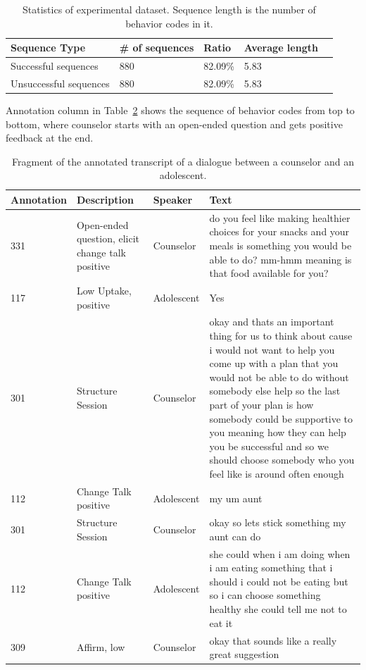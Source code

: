 \documentclass{amia_summit_2018}
\begin{document}
\begin{table}[h]
\centering
\caption{Statistics of experimental dataset. Sequence length is the number of behavior codes in it.}
\label{tab:data_dist}
  \begin{tabular}{|l|l|l|l|l|}
  \hline
   \textbf{Sequence Type} & \textbf{\# of sequences}  & \textbf{Ratio} & \textbf{Average length} \\ \hline      
Successful sequences & 880 & 82.09\% & 5.83 \\\hline
Unsuccessful sequences & 880 & 82.09\% & 5.83 \\\hline
  \end{tabular}
\end{table} 

Annotation column in Table~\ref{tab:anno_examp} shows the sequence of behavior codes from top to bottom, where counselor starts with an open-ended question and gets positive feedback at the end. \\

\begin{table}[h]
\caption{Fragment of the annotated transcript of a dialogue between a counselor and an adolescent.}    
\label{tab:anno_examp}
\centering
\begin{tabular}{|l|p{3.6cm}|l|p{8cm}|}
\hline
Annotation  & Description & Speaker & Text \\\hline
331 &	Open-ended question, elicit change talk positive &	Counselor &	do you feel like making healthier choices for your snacks and your meals is something you would be able to do? mm-hmm meaning is that food available for you? \\\hline
117 &	Low Uptake, positive	& Adolescent &	Yes \\\hline
301 &	Structure Session	& Counselor &	okay and thats an important thing for us to think about cause i would not want to help you come up with a plan that you would not be able to do without somebody else help so the last part of your plan is how somebody could be supportive to you meaning how they can help you be successful and so we should choose somebody who you feel like is around often enough \\\hline
112 &	Change Talk positive	& Adolescent &	my um aunt \\\hline
301 &	Structure Session	& Counselor &	okay so lets stick something my aunt can do \\\hline
112 &	Change Talk positive &	Adolescent &	she could when i am doing when i am eating something that i should i could not be eating but so i can choose something healthy she could tell me not to eat it \\\hline
309 &	Affirm, low &	Counselor &	okay that sounds like a really great suggestion \\\hline
\end{tabular}
\end{table}  
\end{document}
